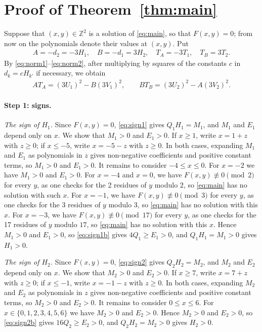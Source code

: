 \documentclass[11pt]{article}
\newcommand{\Z}{\mathbb{Z}}
\begin{document}
\section{Proof of Theorem~\ref{thm:main}}

Suppose that $(x,y)\in\Z^2$ is a solution of \eqref{eq:main}, so that $F(x,y)=0$; from now on the polynomials denote their values at $(x,y)$. Put
\begin{gather*}
A=-d_{2}=-3H_{1},\quad B=-d_{1}=3H_{2},\quad T_A=-3T_{1},\quad T_B=3T_{2}.
\end{gather*}
By \eqref{eq:norm1}--\eqref{eq:norm2}, after multiplying by squares of the constants $c$ in $d_k=cH_{k'}$ if necessary, we obtain
\begin{align}
AT_A=(3U_{1})^2-B(3V_{1})^2,\qquad BT_B=(3U_{2})^2-A(3V_{2})^2.\label{eq:AB}
\end{align}

\paragraph{Step 1: signs.} \emph{The sign of $H_{1}$.} Since $F(x,y)=0$, \eqref{eq:sign1} gives $Q_{1}H_{1}=M_{1}$, and $M_{1}$ and $E_{1}$ depend only on $x$. We show that $M_{1}>0$ and $E_{1}>0$. If $x\geq1$, write $x=1+z$ with $z\geq0$; if $x\leq-5$, write $x=-5-z$ with $z\geq0$. In both cases, expanding $M_{1}$ and $E_{1}$ as polynomials in $z$ gives non-negative coefficients and positive constant terms, so $M_{1}>0$ and $E_{1}>0$. It remains to consider $-4\leq x\leq0$. For $x=-2$ we have $M_{1}>0$ and $E_{1}>0$. For $x=-4$ and $x=0$, we have $F(x,y)\not\equiv0\pmod{2}$ for every $y$, as one checks for the 2 residues of $y$ modulo $2$, so \eqref{eq:main} has no solution with such $x$. For $x=-1$, we have $F(x,y)\not\equiv0\pmod{3}$ for every $y$, as one checks for the 3 residues of $y$ modulo $3$, so \eqref{eq:main} has no solution with this $x$. For $x=-3$, we have $F(x,y)\not\equiv0\pmod{17}$ for every $y$, as one checks for the 17 residues of $y$ modulo $17$, so \eqref{eq:main} has no solution with this $x$. Hence $M_{1}>0$ and $E_{1}>0$, so \eqref{eq:sign1b} gives $4Q_{1}\geq E_{1}>0$, and $Q_{1}H_{1}=M_{1}>0$ gives $H_{1}>0$.

\emph{The sign of $H_{2}$.} Since $F(x,y)=0$, \eqref{eq:sign2} gives $Q_{2}H_{2}=M_{2}$, and $M_{2}$ and $E_{2}$ depend only on $x$. We show that $M_{2}>0$ and $E_{2}>0$. If $x\geq7$, write $x=7+z$ with $z\geq0$; if $x\leq-1$, write $x=-1-z$ with $z\geq0$. In both cases, expanding $M_{2}$ and $E_{2}$ as polynomials in $z$ gives non-negative coefficients and positive constant terms, so $M_{2}>0$ and $E_{2}>0$. It remains to consider $0\leq x\leq6$. For $x\in\{0,\allowbreak 1,\allowbreak 2,\allowbreak 3,\allowbreak 4,\allowbreak 5,\allowbreak 6\}$ we have $M_{2}>0$ and $E_{2}>0$. Hence $M_{2}>0$ and $E_{2}>0$, so \eqref{eq:sign2b} gives $16Q_{2}\geq E_{2}>0$, and $Q_{2}H_{2}=M_{2}>0$ gives $H_{2}>0$.
\end{document}
